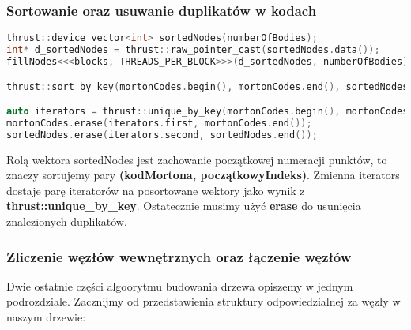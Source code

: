 \documentclass[14pt,twoside,a4paper]{article}
\theoremstyle{definition}
\begin{document}
\subsubsection{\large Sortowanie oraz usuwanie duplikatów w kodach}

\begin{lstlisting}[language=C++, frame=single, framerule=2pt, caption=Kroki 2-4]
thrust::device_vector<int> sortedNodes(numberOfBodies);
int* d_sortedNodes = thrust::raw_pointer_cast(sortedNodes.data());
fillNodes<<<blocks, THREADS_PER_BLOCK>>>(d_sortedNodes, numberOfBodies);

thrust::sort_by_key(mortonCodes.begin(), mortonCodes.end(), sortedNodes.begin());  

auto iterators = thrust::unique_by_key(mortonCodes.begin(), mortonCodes.end(), sortedNodes.begin());
mortonCodes.erase(iterators.first, mortonCodes.end());
sortedNodes.erase(iterators.second, sortedNodes.end());
\end{lstlisting}
\bigskip
Rolą wektora sortedNodes jest zachowanie początkowej numeracji punktów, to znaczy sortujemy pary \textbf{(kodMortona, początkowyIndeks)}.
Zmienna iterators dostaje parę iteratorów na posortowane wektory jako wynik z \textbf{thrust::unique\_by\_key}. Ostatecznie musimy użyć \textbf{erase} do usunięcia znalezionych duplikatów.

\subsubsection{\large Zliczenie węzłów wewnętrznych oraz łączenie węzłów}

Dwie ostatnie części algoorytmu budowania drzewa opiszemy w jednym podrozdziale.
Zacznijmy od przedstawienia struktury odpowiedzialnej za węzły w naszym drzewie:
\end{document}
